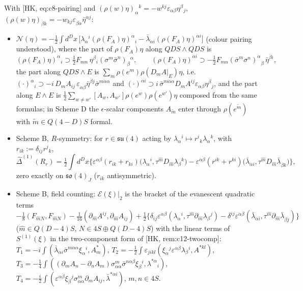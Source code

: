 \begin{remark}
\label{rem:ws2}
With [HK, eq:c8-pairing] and $(\rho(w)\eta)_\alpha{}^k=-w^{kj}\varepsilon_{\alpha\beta}\eta^\beta{}_j$, $(\rho(w)\eta)_{\dot\beta k}=-w_{kj}\varepsilon_{\dot\beta\dot\alpha}\bar\eta^{\dot\alpha j}$:
\begin{itemize}
\item $\mathcal N(\eta)=-\frac12\int d^Dx\,\big[\lambda_\alpha{}^i(\rho(F_A)\eta)^\alpha{}_i-\bar\lambda_{\dot\alpha i}(\rho(F_A)\eta)^{\dot\alpha i}\big]$ (colour pairing understood), where the part of $\rho(F_A)\eta$ along $QDS\wedge QDS$ is
\[
(\rho(F_A)\eta)^\alpha{}_i\supset\tfrac12F_{mn}\,\eta^\beta{}_i(\sigma^m\bar\sigma^n)_\beta{}^\alpha,\qquad (\rho(F_A)\eta)^{\dot\alpha i}\supset-\tfrac12F_{mn}(\bar\sigma^m\sigma^n)^{\dot\alpha}{}_{\dot\beta}\,\bar\eta^{\dot\beta i},
\]
the part along $QDS\wedge E$ is $\sum_m\rho(e^m)\rho(D_mA|_E)\eta$, i.e. $(\cdot)^\alpha{}_i\supset-i\,D_mA_{ij}\,\varepsilon_{\dot\alpha\dot\beta}\bar\eta^{\dot\beta j}\bar\sigma^{m\dot\alpha\alpha}$ and $(\cdot)^{\dot\alpha i}\supset i\,\bar\sigma^{m\dot\alpha\alpha}D_mA^{ij}\varepsilon_{\alpha\beta}\eta^\beta{}_j$, and the part along $E\wedge E$ is $\frac12\sum_{w\neq w'}[A_w,A_{w'}]\rho(e^w)\rho(e^{w'})\eta$ composed from the same formulas; in Scheme D the $\epsilon$-scalar components $A_{\tilde m}$ enter through $\rho(e^{\tilde m})$ with $\tilde m\in Q(4{-}D)S$ formal.
\item Scheme B, $R$-symmetry: for $r\in\mathfrak{su}(4)$ acting by $\lambda_\alpha{}^i\mapsto r^i{}_k\lambda_\alpha{}^k$, with $r_{ik}:=\delta_{ij}r^j{}_k$,
\[
\widehat\Delta^{(1)}(R_r)=\tfrac12\int d^Dx\Big\{\varepsilon^{\alpha\beta}(r_{ik}+r_{ki})\big(\lambda_\alpha{}^i,\tau^{\hat m}D_{\hat m}\lambda_\beta{}^k\big)-\varepsilon^{\dot\alpha\dot\beta}(r^{ik}+r^{ki})\big(\bar\lambda_{\dot\alpha i},\tau^{\hat m}D_{\hat m}\bar\lambda_{\dot\beta k}\big)\Big\},
\]
zero exactly on $\mathfrak{so}(4)_J$ ($r_{ik}$ antisymmetric).
\item Scheme B, field counting: $\mathcal E(\xi)|_2$ is the bracket of the evanescent quadratic terms $-\frac18(F_{\hat mN},F_{\hat mN})-\frac1{16}(\partial_{\hat m}A^{ij},\partial_{\hat m}A_{ij})+\frac12\{\delta_{ij}\varepsilon^{\alpha\beta}(\lambda_\alpha{}^i,\tau^{\hat m}\partial_{\hat m}\lambda_\beta{}^j)-\delta^{ij}\varepsilon^{\dot\alpha\dot\beta}(\bar\lambda_{\dot\alpha i},\tau^{\hat m}\partial_{\hat m}\bar\lambda_{\dot\beta j})\}$ ($\hat m\in Q(D{-}4)S$, $N\in4S\oplus Q(D{-}4)S$) with the linear terms of $S^{(1)}(\xi)$ in the two-component form of [HK, rem:c12-twocomp]: $T_1=-i\int(\bar\lambda_{\dot\alpha i}\bar\sigma^{m\dot\alpha\alpha}\xi_\alpha{}^i,A^*_m)$, $T_2=-\frac12\int\varepsilon_{jikl}(\xi_\alpha{}^j\varepsilon^{\alpha\beta}\lambda_\beta{}^i,A^{*kl})$, $T_3=-\frac14\int((\partial_mA_n-\partial_nA_m)\sigma^m_{\alpha\dot\alpha}\bar\sigma^{n\dot\alpha\beta}\xi_\beta{}^i,\lambda^{*\alpha}{}_i)$, $T_4=-\frac i2\int(\varepsilon^{\alpha\beta}\xi_\beta{}^j\sigma^m_{\alpha\dot\alpha}\partial_mA_{ij},\bar\lambda^{*\dot\alpha i})$, $m,n\in4S$.

\end{itemize}
\end{remark}
